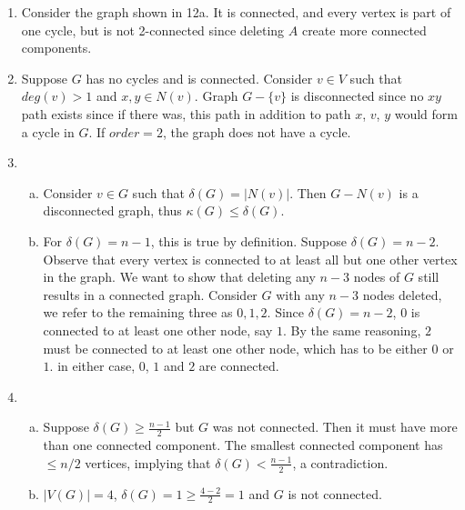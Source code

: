 \documentclass[11pt]{article}
\begin{document}
\begin{enumerate}[1.]
    \item %
        Consider the graph shown in 12a. It is connected, and every vertex is part of 
        one cycle, but is not 2-connected since deleting $A$ create more connected 
        components.
    \item %
        Suppose $G$ has no cycles and is connected. Consider $v \in V$ such that 
        $deg(v) > 1$ and $x,y \in N(v)$. Graph $G - \{v\}$ is disconnected since 
        no $xy$ path exists since if there was, this path in addition to 
        path $x$, $v$, $y$ would form a cycle in $G$. If $order = 2$, the graph does 
        not have a cycle. 
    \item %
        \begin{enumerate}[a)]
            \item
                Consider $v \in G$ such that $\delta(G) = |N(v)|$. Then 
                $G - N(v)$ is a disconnected graph, thus $\kappa(G) \leq \delta(G)$.
            \item
                For $\delta(G) = n - 1$, this is true by definition. \newline
                Suppose $\delta(G) = n - 2$. Observe that every vertex is 
                connected to at least all but one other vertex in the graph.
                We want to show that deleting any $n-3$ nodes of $G$ still results
                in a connected graph. Consider $G$ with any $n-3$ nodes deleted, 
                we refer to the remaining three as $0, 1, 2$. Since $\delta(G) =
                n - 2$, $0$ is connected to at least one other node, say $1$. By
                the same reasoning, $2$ must be connected to at least one other 
                node, which has to be either $0$ or $1$. in either case, $0$, $1$
                and $2$ are connected. 

        \end{enumerate}

    \item %
        \begin{enumerate}[a)]
            \item
                Suppose $\delta(G) \geq \frac{n-1}{2}$ but $G$ was not connected.
                Then it must have more than one connected component. The smallest
                connected component has $\leq n/2$ vertices, implying that 
                $\delta(G) < \frac{n-1}{2}$, a contradiction. 
            \item

            $|V(G)| = 4$, $\delta(G) = 1 \geq \frac{4 - 2}{2} = 1$ and $G$ is 
            not connected. 
        \end{enumerate}

\end{enumerate}
\end{document}
